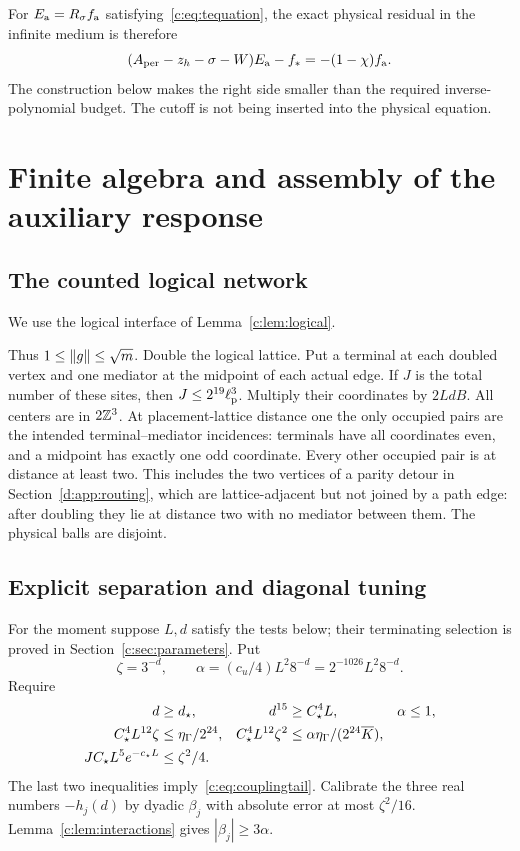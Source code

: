 For $E_{\rm a}=R_\sigma f_{\rm a}$ satisfying~\eqref{c:eq:tequation}, the exact
physical residual in the infinite medium is therefore
\begin{equation}
 (A_{\rm per}-z_h-\sigma-W)E_{\rm a}-f_*
       =-(1-\chi)f_{\rm a}.                                 \label{c:eq:physicalleakidentity}
\end{equation}
The construction below makes the right side smaller than the required
inverse-polynomial budget. The cutoff is not being inserted into the
physical equation.

\section{Finite algebra and assembly of the auxiliary response}
\label{c:sec:assembly}

\subsection{The counted logical network}\label{c:sec:network}
We use the logical interface of Lemma~\ref{c:lem:logical}.


Thus $1\le\left\lVert g\right\rVert\le\sqrt m$.
Double the logical lattice. Put a terminal at each doubled vertex and
one mediator at the midpoint of each actual edge. If $J$ is the total
number of these sites, then $J\le2^{19}\ell_{\rm p}^3$. Multiply their coordinates
by $2LdB$. All centers are in $2\mathbb Z^3$. At placement-lattice distance
one the only occupied pairs are the intended terminal--mediator
incidences: terminals have all coordinates even, and a midpoint has
exactly one odd coordinate. Every other occupied pair is at distance
at least two. This includes the two vertices of a parity detour in
Section~\ref{d:app:routing}, which are lattice-adjacent but not joined
by a path edge: after doubling they lie at distance two with no mediator
between them. The physical balls are disjoint.

\subsection{Explicit separation and diagonal tuning}
For the moment suppose $L,d$ satisfy the tests below; their terminating
selection is proved in Section~\ref{c:sec:parameters}. Put
\begin{equation}
 \zeta=3^{-d},\qquad
 \alpha=(c_u/4)L^2 8^{-d}=2^{-1026}L^2 8^{-d}.         \label{c:eq:alpha}
\end{equation}
Require
\begin{align}
 d&\ge d_\star, &d^{15}&\ge C_\star^4L, &\alpha&\le1,\\
 C_\star^4L^{12}\zeta&\le\eta_\Gamma/2^{24},
 &C_\star^4L^{12}\zeta^2&\le\alpha\eta_\Gamma/(2^{24}\overline K),          \label{c:eq:dtests}\\
 JC_\star L^5e^{-c_\star L}&\le\zeta^2/4.                   \label{c:eq:Ltailtest}
\end{align}
The last two inequalities imply~\eqref{c:eq:couplingtail}.
Calibrate the three real numbers $-h_j(d)$ by dyadic $\beta_j$ with
absolute error at most $\zeta^2/16$. Lemma~\ref{c:lem:interactions} gives
$|\beta_j|\ge3\alpha$.

